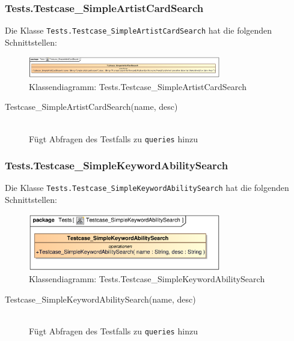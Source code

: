\subsubsection{Tests.Testcase\_SimpleArtistCardSearch}
Die Klasse \verb|Tests.Testcase_SimpleArtistCardSearch| hat die folgenden Schnittstellen:
\begin{figure}[H]
    \myfloatalign
    \includegraphics[width=0.75\textwidth]{gfx/MtGDeepAnalysis/Testcase_SimpleArtistCardSearch.eps}
    \caption{Klassendiagramm: Tests.Testcase\_SimpleArtistCardSearch}
    \label{fig:class:tests.Testcase_SimpleArtistCardSearch}
\end{figure}
\begin{description}
    \item[Testcase\_SimpleArtistCardSearch(name, desc)] \hfill \\
    Fügt Abfragen des Testfalls zu \verb|queries| hinzu
\end{description}

\subsubsection{Tests.Testcase\_SimpleKeywordAbilitySearch}
Die Klasse \verb|Tests.Testcase_SimpleKeywordAbilitySearch| hat die folgenden Schnittstellen:
\begin{figure}[H]
    \myfloatalign
    \includegraphics[width=0.75\textwidth]{gfx/MtGDeepAnalysis/Testcase_SimpleKeywordAbilitySearch.eps}
    \caption{Klassendiagramm: Tests.Testcase\_SimpleKeywordAbilitySearch}
    \label{fig:class:tests.Testcase_SimpleKeywordAbilitySearch}
\end{figure}
\begin{description}
    \item[Testcase\_SimpleKeywordAbilitySearch(name, desc)] \hfill \\
    Fügt Abfragen des Testfalls zu \verb|queries| hinzu
\end{description}

